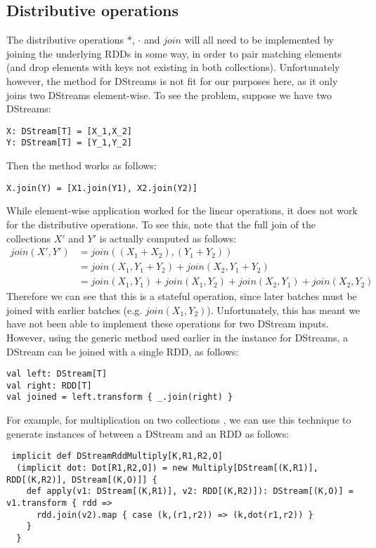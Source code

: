 \subsection{Distributive operations} \label{distoperatorsdstream}
The distributive operations $*$, $\cdot$ and $join$ will all need to be implemented by joining the underlying RDDs in some way, in order to pair matching elements (and drop elements with keys not existing in both collections). Unfortunately however, the  method for DStreams is not fit for our purposes here, as it only joins two DStreams element-wise. To see the problem, suppose we have two DStreams:
\begin{lstlisting}
X: DStream[T] = [X_1,X_2] 
Y: DStream[T] = [Y_1,Y_2]
\end{lstlisting}
Then the  method works as follows:
\begin{lstlisting}
X.join(Y) = [X1.join(Y1), X2.join(Y2)]
\end{lstlisting}
While element-wise application worked for the linear operations, it does not work for the distributive operations. To see this, note that the full join of the collections $X'$ and $Y'$ is actually computed as follows:
\begin{equation*}
\begin{split}
join(X',Y') &= join((X_1 + X_2),(Y_1 + Y_2)) \\
&= join(X_1,Y_1 + Y_2) + join(X_2,Y_1 + Y_2) \\
&= join(X_1,Y_1) + join(X_1,Y_2) + join(X_2,Y_1) + join(X_2,Y_2)
\end{split}
\end{equation*}
Therefore we can see that this is a stateful operation, since later batches must be joined with earlier batches (e.g. $join(X_1,Y_2)$). Unfortunately, this has meant we have not been able to implement these operations for two DStream inputs. However, using the generic  method used earlier in the  instance for DStreams, a DStream can be joined with a single RDD, as follows:
\vs\begin{lstlisting}
val left: DStream[T]
val right: RDD[T]
val joined = left.transform { _.join(right) }
\end{lstlisting}\vs
For example, for multiplication on two collections , we can use this technique to generate instances of  between a DStream and an RDD as follows:
\vs\begin{lstlisting}
 implicit def DStreamRddMultiply[K,R1,R2,O]
  (implicit dot: Dot[R1,R2,O]) = new Multiply[DStream[(K,R1)], RDD[(K,R2)], DStream[(K,O)]] {
    def apply(v1: DStream[(K,R1)], v2: RDD[(K,R2)]): DStream[(K,O)] = v1.transform { rdd =>
      rdd.join(v2).map { case (k,(r1,r2)) => (k,dot(r1,r2)) }
    }
  }
\end{lstlisting}\vs

